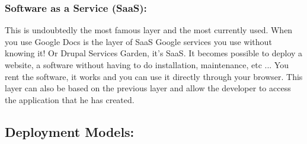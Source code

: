 \subsubsection{Software as a Service (SaaS):}

This is undoubtedly the most famous layer and the most currently used. When you use Google Docs is the layer of SaaS Google services 
you use without knowing it! Or Drupal Services Garden, it's SaaS.
It becomes possible to deploy a website, a software without having to do installation, maintenance, etc ... 
You rent the software, it works and you can use it directly through your browser.
This layer can also be based on the previous layer and allow the developer to access the application that he has created.

% 
\subsection{Deployment Models:} 

